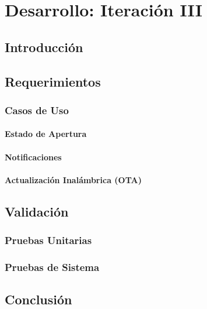 \chapter{Desarrollo: Iteración III} %

\label{Chapter8} %


\section{Introducción}
\section{Requerimientos}
\subsection{Casos de Uso}
\subsubsection{Estado de Apertura}
\subsubsection{Notificaciones}
\subsubsection{Actualización Inalámbrica (OTA)}
\section{Validación}
\subsection{Pruebas Unitarias}
\subsection{Pruebas de Sistema}
\section{Conclusión}